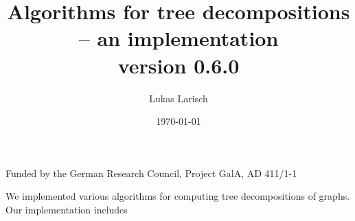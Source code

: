 \documentclass[a4wide]{article}
\begin{document}
\title{Algorithms for tree decompositions -- an implementation\\
\small{version 0.6.0}}
\author{Lukas Larisch}

\date{\today}
\maketitle


Funded by the German Research Council, Project GalA, AD 411/1-1 \\

\vspace*{0.6cm}

We implemented various algorithms for computing tree decompositions of graphs. \\
Our implementation includes \\
\end{document}
